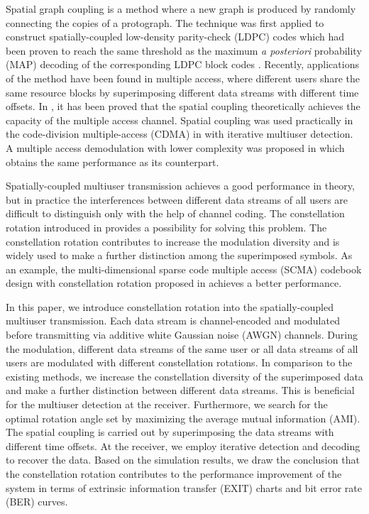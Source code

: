 \documentclass[conference]{IEEEtran}
\begin{document}
Spatial graph coupling is a method where a new graph is produced by randomly connecting the copies of a protograph. The technique was first applied to construct spatially-coupled low-density parity-check (LDPC) codes \cite{4} which had been proven to reach the same threshold as the maximum \emph{a posteriori} probability (MAP) decoding of the corresponding LDPC block codes \cite{5}. Recently, applications of the method have been found in multiple access, where different users share the same resource blocks by superimposing different data streams with different time offsets. In \cite{6}, it has been proved that the spatial coupling theoretically achieves the capacity of the multiple access channel. Spatial coupling was used practically in the code-division multiple-access (CDMA) in \cite{7} with iterative multiuser detection. A multiple access demodulation with lower complexity was proposed in \cite{8} which obtains the same performance as its counterpart.

Spatially-coupled multiuser transmission achieves a good performance in theory, but in practice the interferences between different data streams of all users are difficult to distinguish only with the help of channel coding. The constellation rotation introduced in \cite{9} provides a possibility for solving this problem. The constellation rotation contributes to increase the modulation diversity and is widely used to make a further distinction among the superimposed symbols. As an example, the multi-dimensional sparse code multiple access (SCMA) codebook design with constellation rotation proposed in \cite{10} achieves a better performance.

In this paper, we introduce constellation rotation into the spatially-coupled multiuser transmission. Each data stream is channel-encoded and modulated before transmitting via additive white Gaussian noise (AWGN) channels. During the modulation, different data streams of the same user or all data streams of all users are modulated with different constellation rotations. In comparison to the existing methods, we increase the constellation diversity of the superimposed data and make a further distinction between different data streams. This is beneficial for the multiuser detection at the receiver. Furthermore, we search for the optimal rotation angle set by maximizing the average mutual information (AMI). The spatial coupling is carried out by superimposing the data streams with different time offsets. At the receiver, we employ iterative detection and decoding to recover the data. Based on the simulation results, we draw the conclusion that the constellation rotation contributes to the performance improvement of the system in terms of extrinsic information transfer (EXIT) charts and bit error rate (BER) curves.
\end{document}
